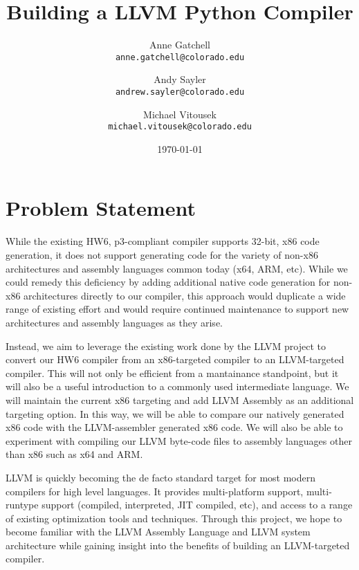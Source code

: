 \documentclass[11pt]{article}
\begin{document}
\title{
  Building a LLVM Python Compiler
}

\author{
  Anne Gatchell    \\ \texttt{anne.gatchell@colorado.edu} \and
  Andy Sayler      \\ \texttt{andrew.sayler@colorado.edu} \and
  Michael Vitousek \\ \texttt{michael.vitousek@colorado.edu}
}

\date{\today}

\maketitle

\section{Problem Statement}

While the existing HW6, p3-compliant compiler supports 32-bit,
x86 code generation, it does not support generating code for the variety
of non-x86 architectures and assembly languages common today (x64, ARM,
etc). While we could remedy
this deficiency by adding additional native code generation for non-x86
architectures directly to our compiler, this approach would duplicate a
wide range of existing effort and would require continued maintenance to
support new architectures and assembly languages as they arise.

Instead, we aim to leverage the existing work done by the LLVM project
\cite{llvm.org} to
convert our HW6 compiler from an x86-targeted compiler to
an LLVM-targeted compiler. This will not only be efficient from a mantainance
standpoint, but it will also be a useful introduction to a commonly
used intermediate language. We will maintain the current x86 targeting
and add LLVM Assembly\cite{lattner-llvmlangref}
as an additional targeting option. In
this way, we will be able to compare our natively generated x86 code
with the LLVM-assembler generated x86 code. We will also be able to
experiment with compiling our LLVM byte-code files to assembly
languages other than x86 such as x64 and ARM.

LLVM is quickly becoming the de facto standard target for most modern
compilers for high level languages.
It provides multi-platform support, multi-runtype support
(compiled, interpreted, JIT compiled, etc), and access to a
range of existing optimization tools and techniques. Through this
project, we hope to become
familiar with the LLVM Assembly Language and LLVM system architecture
while gaining insight into the benefits of building an LLVM-targeted
compiler. 
\end{document}
